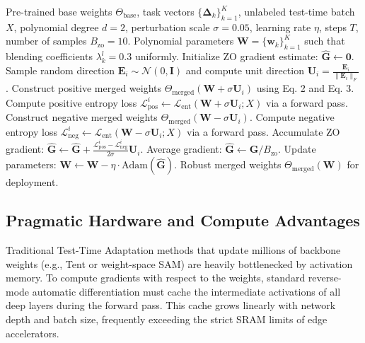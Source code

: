 \begin{algorithm}[tb]
\caption{ZO-FlatMerge Test-Time Adaptation}
\label{alg:flatmerge}
\begin{algorithmic}[1]
 Pre-trained base weights $\Theta_{\text{base}}$, task vectors $\{\mathbf{\Delta}_k\}_{k=1}^K$, unlabeled test-time batch $X$, polynomial degree $d=2$, perturbation scale $\sigma = 0.05$, learning rate $\eta$, steps $T$, number of samples $B_{\text{zo}} = 10$.
 Polynomial parameters $\mathbf{W} = \{\mathbf{w}_k\}_{k=1}^K$ such that blending coefficients $\lambda^l_k = 0.3$ uniformly.
    \STATE Initialize ZO gradient estimate: $\hat{\mathbf{G}} \leftarrow \mathbf{0}$.
        \STATE Sample random direction $\mathbf{E}_i \sim \mathcal{N}(0, \mathbf{I})$ and compute unit direction $\mathbf{U}_i = \frac{\mathbf{E}_i}{\|\mathbf{E}_i\|_F}$.
        \STATE Construct positive merged weights $\Theta_{\text{merged}}(\mathbf{W} + \sigma \mathbf{U}_i)$ using Eq. 2 and Eq. 3.
        \STATE Compute positive entropy loss $\mathcal{L}_{\text{pos}}^i \leftarrow \mathcal{L}_{\text{ent}}(\mathbf{W} + \sigma \mathbf{U}_i; X)$ via a forward pass.
        \STATE Construct negative merged weights $\Theta_{\text{merged}}(\mathbf{W} - \sigma \mathbf{U}_i)$.
        \STATE Compute negative entropy loss $\mathcal{L}_{\text{neg}}^i \leftarrow \mathcal{L}_{\text{ent}}(\mathbf{W} - \sigma \mathbf{U}_i; X)$ via a forward pass.
        \STATE Accumulate ZO gradient: $\hat{\mathbf{G}} \leftarrow \hat{\mathbf{G}} + \frac{\mathcal{L}_{\text{pos}}^i - \mathcal{L}_{\text{neg}}^i}{2 \sigma} \mathbf{U}_i$.
    \ENDFOR
    \STATE Average gradient: $\hat{\mathbf{G}} \leftarrow \hat{\mathbf{G}} / B_{\text{zo}}$.
    \STATE Update parameters: $\mathbf{W} \leftarrow \mathbf{W} - \eta \cdot \text{Adam}(\hat{\mathbf{G}})$.
\ENDFOR
{} Robust merged weights $\Theta_{\text{merged}}(\mathbf{W})$ for deployment.
\end{algorithmic}
\end{algorithm}

\subsection{Pragmatic Hardware and Compute Advantages}
Traditional Test-Time Adaptation methods that update millions of backbone weights (e.g., Tent or weight-space SAM) are heavily bottlenecked by activation memory. 
To compute gradients with respect to the weights, standard reverse-mode automatic differentiation must cache the intermediate activations of all deep layers during the forward pass. 
This cache grows linearly with network depth and batch size, frequently exceeding the strict SRAM limits of edge accelerators.

